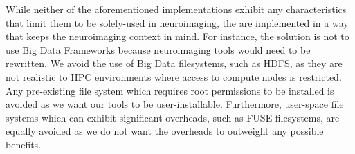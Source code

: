 While neither of the aforementioned implementations exhibit any characteristics
that limit them to be solely-used in neuroimaging, the are implemented in a way
that keeps the neuroimaging context in mind. For instance, the solution is not
to use Big Data Frameworks because neuroimaging tools would need to be
rewritten. We avoid the use of Big Data filesystems, such as HDFS, as they are
not realistic to HPC environments where access to compute nodes is restricted.
Any pre-existing file system which requires root permissions to be installed is
avoided as we want our tools to be user-installable. Furthermore, user-space
file systems which can exhibit significant overheads, such as FUSE filesystems,
are equally avoided as we do not want the overheads to outweight any possible
benefits.